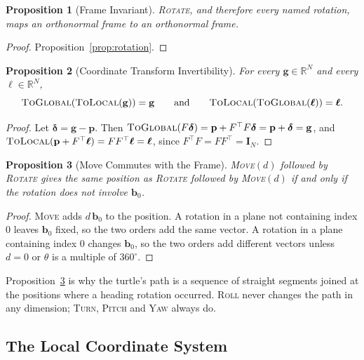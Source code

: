 \documentclass[11pt,letterpaper]{article}
\newtheorem{proposition}{Proposition}[section]
\newcommand{\R}{\mathbb{R}}
\newcommand{\pos}{\mathbf{p}}
\newcommand{\basis}{\mathbf{b}}
\newcommand{\eye}{\mathbf{I}}
\newcommand{\op}[1]{\textup{\textsc{#1}}}
\begin{document}
\begin{proposition}[Frame Invariant]
\label{prop:frame}
\op{Rotate}, and therefore every named rotation, maps an
orthonormal frame to an orthonormal frame.
\end{proposition}

\begin{proof}
Proposition~\ref{prop:rotation}.
\end{proof}

\begin{proposition}[Coordinate Transform Invertibility]
\label{prop:coords}
For every $\mathbf{g} \in \R^N$ and every $\bm{\ell} \in \R^N$,
\begin{equation*}
\op{ToGlobal}(\op{ToLocal}(\mathbf{g})) = \mathbf{g}
\qquad\text{and}\qquad
\op{ToLocal}(\op{ToGlobal}(\bm{\ell})) = \bm{\ell}.
\end{equation*}
\end{proposition}

\begin{proof}
Let $\bm{\delta} = \mathbf{g} - \pos$. Then
$\op{ToGlobal}(F\bm{\delta}) = \pos + F^\top F \bm{\delta} = \pos +
\bm{\delta} = \mathbf{g}$, and
$\op{ToLocal}(\pos + F^\top\bm{\ell}) = F F^\top \bm{\ell} =
\bm{\ell}$, since $F^\top F = F F^\top = \eye_N$.
\end{proof}

\begin{proposition}[Move Commutes with the Frame]
\label{prop:move}
\op{Move}$(d)$ followed by \op{Rotate} gives the same position
as \op{Rotate} followed by \op{Move}$(d)$ if and only if the
rotation does not involve $\basis_0$.
\end{proposition}

\begin{proof}
\op{Move} adds $d\,\basis_0$ to the position. A rotation in a plane
not containing index $0$ leaves $\basis_0$ fixed, so the two orders add
the same vector. A rotation in a plane containing index $0$ changes
$\basis_0$, so the two orders add different vectors unless $d = 0$ or
$\theta$ is a multiple of $360^\circ$.
\end{proof}

Proposition~\ref{prop:move} is why the turtle's path is a sequence of
straight segments joined at the positions where a heading rotation
occurred. \op{Roll} never changes the path in any dimension;
\op{Turn}, \op{Pitch} and \op{Yaw} always do.

\subsection{The Local Coordinate System}
\end{document}
